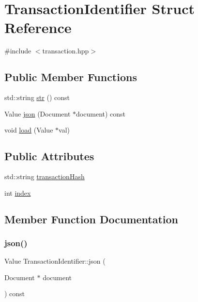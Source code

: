 \hypertarget{structTransactionIdentifier}{}\section{Transaction\+Identifier Struct Reference}
\label{structTransactionIdentifier}


{\ttfamily \#include $<$transaction.\+hpp$>$}

\subsection*{Public Member Functions}
\begin{DoxyCompactItemize}
\item 
std\+::string \mbox{\hyperlink{structTransactionIdentifier_a00d46c50b8e79327f4c3b9bc32a7f679}{str}} () const
\item 
Value \mbox{\hyperlink{structTransactionIdentifier_ab8879716182a6beddfc4093e73703324}{json}} (Document $\ast$document) const
\item 
void \mbox{\hyperlink{structTransactionIdentifier_a0f109058df0aa00717a1acdc10fbc97e}{load}} (Value $\ast$val)
\end{DoxyCompactItemize}
\subsection*{Public Attributes}
\begin{DoxyCompactItemize}
\item 
std\+::string \mbox{\hyperlink{structTransactionIdentifier_a4fbb1245879f1cccdc27b64ad7f0cbac}{transaction\+Hash}}
\item 
int \mbox{\hyperlink{structTransactionIdentifier_a667fa04ae76976ba5b3940621fb5f8ad}{index}}
\end{DoxyCompactItemize}


\subsection{Member Function Documentation}
\mbox{\label{structTransactionIdentifier_ab8879716182a6beddfc4093e73703324}} 
\subsubsection{\texorpdfstring{json()}{json()}}
{\footnotesize\ttfamily Value Transaction\+Identifier\+::json (\begin{DoxyParamCaption}\item[{Document $\ast$}]{document }\end{DoxyParamCaption}) const}


